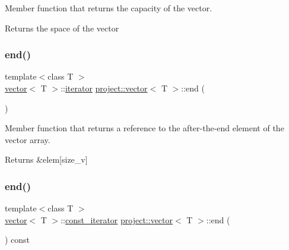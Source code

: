 Member function that returns the capacity of the vector. 

\begin{DoxyReturn}{Returns}
the space of the vector 
\end{DoxyReturn}
\mbox{\label{classproject_1_1vector_a3b63135e2ef4bca97d475d743c86f50a}} 
\subsubsection{\texorpdfstring{end()}{end()}\hspace{0.1cm}{\footnotesize\ttfamily [1/2]}}
{\footnotesize\ttfamily template$<$class T $>$ \\
\mbox{\hyperlink{classproject_1_1vector}{vector}}$<$ T $>$\+::\mbox{\hyperlink{classproject_1_1vector_a429c6a5f47b0de55ac858b3be5aeda8b}{iterator}} \mbox{\hyperlink{classproject_1_1vector}{project\+::vector}}$<$ T $>$\+::end (\begin{DoxyParamCaption}{ }\end{DoxyParamCaption})\hspace{0.3cm}{\ttfamily [inline]}}



Member function that returns a reference to the after-\/the-\/end element of the vector array. 

\begin{DoxyReturn}{Returns}
\&elem\mbox{[}size\+\_\+v\mbox{]} 
\end{DoxyReturn}
\mbox{\label{classproject_1_1vector_acbbe95f585298ffc4061563b6ce4fe98}} 
\subsubsection{\texorpdfstring{end()}{end()}\hspace{0.1cm}{\footnotesize\ttfamily [2/2]}}
{\footnotesize\ttfamily template$<$class T $>$ \\
\mbox{\hyperlink{classproject_1_1vector}{vector}}$<$ T $>$\+::\mbox{\hyperlink{classproject_1_1vector_ab242a1c8c7abec9b305e502ff7cd0fb2}{const\+\_\+iterator}} \mbox{\hyperlink{classproject_1_1vector}{project\+::vector}}$<$ T $>$\+::end (\begin{DoxyParamCaption}{ }\end{DoxyParamCaption}) const\hspace{0.3cm}{\ttfamily [inline]}}



